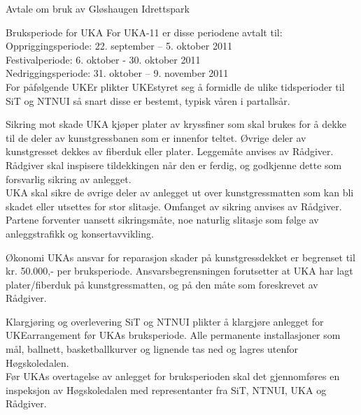 \documentclass[../fsbok.tex]{subfiles}
\begin{document}
\begin{instruks*}{Avtale om bruk av Gløshaugen Idrettspark}
\begin{instruksledd}{Bruksperiode for UKA}
For UKA-11 er disse periodene avtalt til:\\

Oppriggingsperiode: 	22. september – 5. oktober 2011\\
Festivalperiode: 	6. oktober - 30. oktober 2011\\
Nedriggingsperiode:	31. oktober – 9. november 2011\\

For påfølgende UKEr plikter UKEstyret seg å formidle de ulike tidsperioder til SiT og NTNUI så snart disse er bestemt, typisk våren i partallsår.
\end{instruksledd}

\begin{instruksledd}{Sikring mot skade}
UKA kjøper plater av kryssfiner som skal brukes for å dekke til de deler av kunstgressbanen som er innenfor teltet.  Øvrige deler av kunstgresset dekkes av fiberduk eller plater.  Leggemåte anvises av Rådgiver. Rådgiver skal inspisere tildekkingen når den er ferdig, og godkjenne dette som forsvarlig sikring av anlegget.\\  

UKA skal sikre de øvrige deler av anlegget ut over kunstgressmatten som kan bli skadet eller utsettes for stor slitasje. Omfanget av sikring anvises av Rådgiver. \\
 
Partene forventer uansett sikringsmåte, noe naturlig slitasje som følge av anleggstrafikk og konsertavvikling.\\
\end{instruksledd}
 
\begin{instruksledd}{Økonomi}
UKAs ansvar for reparasjon skader på kunstgressdekket er begrenset til kr. 50.000,- per bruksperiode.  Ansvarsbegrensningen forutsetter at UKA har lagt plater/fiberduk på kunstgressmatten, og på den måte som foreskrevet av Rådgiver.\\
\end{instruksledd}
  

\begin{instruksledd}{Klargjøring og overlevering}
SiT og NTNUI plikter å klargjøre anlegget for UKEarrangement før UKAs bruksperiode. Alle permanente installasjoner som mål, ballnett, basketballkurver og lignende tas ned og lagres utenfor Høgskoledalen.\\

Før UKAs overtagelse av anlegget for bruksperioden skal det gjennomføres en inspeksjon av Høgskoledalen med representanter fra SiT, NTNUI, UKA og Rådgiver. \\


\end{instruksledd}
\end{instruks*}
\end{document}
